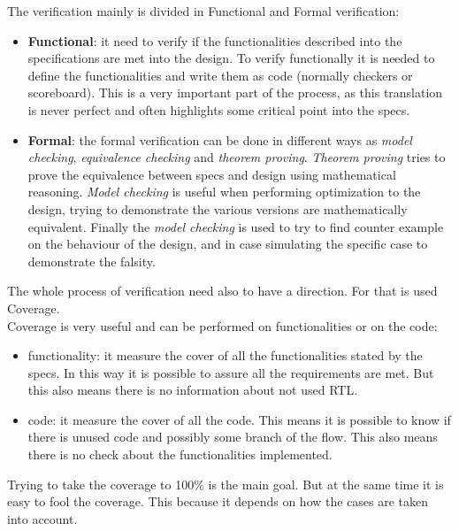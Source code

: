 The verification mainly is divided in Functional and Formal verification:
\begin{itemize}
    \item \textbf{Functional}: it need to verify if the functionalities described into the specifications are met into the design. To verify functionally it is needed to define the functionalities and write them as code (normally checkers or scoreboard). This is a very important part of the process, as this translation is never perfect and often highlights some critical point into the specs.
    
    \item \textbf{Formal}: the formal verification can be done in different ways as \textit{model checking}, \textit{equivalence checking} and \textit{theorem proving}. \textit{Theorem proving} tries to prove the equivalence between specs and design using mathematical reasoning. \textit{Model checking} is useful when performing optimization to the design, trying to demonstrate the various versions are mathematically equivalent. Finally the \textit{model checking} is used to try to find counter example on the behaviour of the design, and in case simulating the specific case to demonstrate the falsity.
\end{itemize}

\bigskip


The whole process of verification need also to have a direction. For that is used Coverage. \\

Coverage is very useful and can be performed on functionalities or on the code:
\begin{itemize}
    \item functionality: it measure the cover of all the functionalities stated by the specs. In this way it is possible to assure all the requirements are met. But this also means there is no information about not used RTL.
    
    \item code: it measure the cover of all the code. This means it is possible to know if there is unused code and possibly some branch of the flow. This also means there is no check about the functionalities implemented.

\end{itemize}

Trying to take the coverage to 100\% is the main goal. But at the same time it is easy to fool the coverage. This because it depends on how the cases are taken into account. \\

